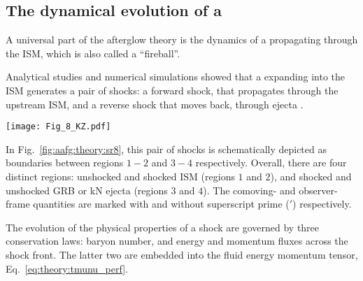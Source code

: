 \subsection{The dynamical evolution of a \blast{}}

A universal part of the afterglow theory is the dynamics of a  
\blast{} propagating through the \ac{ISM}, which is also called a ``fireball''.

Analytical studies and numerical simulations showed that a \blast{} 
expanding into the \ac{ISM} generates a pair of shocks: a forward shock, that 
propagates through the upstream \ac{ISM}, and a reverse shock that moves back, 
through ejecta \citep[\eg][]{Blandford:1976,Ayache:2021six}. 
\begin{figure*}[t]
    \centering 
    \texttt{[image: Fig\_8\_KZ.pdf]}
    \caption{
        Schematic sketch of a pair of shocks produced when a relativistic
        jet from a \ac{GRB} collides with the \ac{ISM}, as viewed from the
        rest frame of the unshocked \ac{ISM}. Regions 2 \& 3 represent the shocked \ac{ISM} and shocked \ac{GRB} 
        ejecta respectively. They move together with the same \ac{LF} ($\gamma_2$, as viewed
        by a stationary observer in the unshocked \ac{ISM}), and have the same pressure but
        different densities.
        (Adapted from \citet{Kumar:2014upa}, Fig.~8)
    }
    \label{fig:aafg:theory:sr8}
\end{figure*}
In Fig.~\ref{fig:aafg:theory:sr8}, this pair of shocks is schematically depicted as 
boundaries between regions $1-2$ and $3-4$ respectively. 
Overall, there are four distinct regions: unshocked and shocked \ac{ISM} 
(regions $1$ and $2$), and shocked and unshocked \ac{GRB} or \ac{kN} ejecta 
(regions $3$ and $4$).
The comoving- and observer-frame quantities are marked with and 
without superscript prime ($'$) respectively. 

The evolution of the physical properties of a shock are governed by three conservation laws: 
baryon number, and energy and momentum fluxes across the shock front. 
The latter two are embedded into the fluid energy momentum tensor, Eq.~\eqref{eq:theory:tmunu_perf}. 


